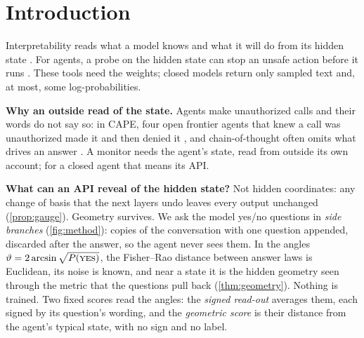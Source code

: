\section{Introduction}
\label{sec:intro}
Interpretability reads what a model knows and what it will do from its hidden state \citep{burns2023ccs,marks2023geometry,zou2023repe,arditi2024refusal,goldowskydill2025probes}. For agents, a probe on the hidden state can stop an unsafe action before it runs \citep{fayyazi2026cape}. These tools need the weights; closed models return only sampled text and, at most, some log-probabilities.

\textbf{Why an outside read of the state.} Agents make unauthorized calls and their words do not say so: in CAPE, four open frontier agents that knew a call was unauthorized made it and then denied it \citep{fayyazi2026cape}, and chain-of-thought often omits what drives an answer \citep{turpin2023unfaithful,chen2025reasoning}. A monitor needs the agent's state, read from outside its own account; for a closed agent that means its API.

\textbf{What can an API reveal of the hidden state?} Not hidden coordinates: any change of basis that the next layers undo leaves every output unchanged (\cref{prop:gauge}). Geometry survives. We ask the model yes/no questions in \emph{side branches} (\cref{fig:method}): copies of the conversation with one question appended, discarded after the answer, so the agent never sees them. In the angles $\vartheta=2\arcsin\sqrt{P(\textsc{yes})}$, the Fisher--Rao distance between answer laws is Euclidean, its noise is known, and near a state it is the hidden geometry seen through the metric that the questions pull back (\cref{thm:geometry}). Nothing is trained. Two fixed scores read the angles: the \emph{signed read-out} averages them, each signed by its question's wording, and the \emph{geometric score} is their distance from the agent's typical state, with no sign and no label.


